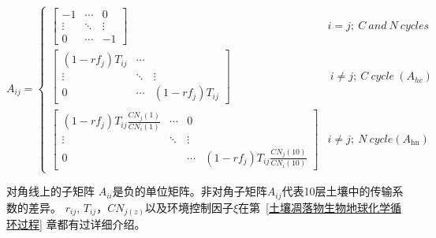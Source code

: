 \begin{equation}
  A_{i j}=\left\{\begin{array}{ccc}{\left[\begin{array}{ccc}-1 & \cdots & 0 \\ \vdots & \ddots & \vdots \\ 0 & \cdots & -1\end{array}\right]}   &i=j;\ C\ and\ N\ cycles \\
      {\left[\begin{array}{ccc}\left(1-r f_{j}\right) T_{i j} & \cdots & \\ \vdots & \ddots & \vdots \\ 0 & \cdots & \left(1-r f_{j}\right) T_{i j}\end{array}\right]}   &\ i\neq j;\ C\ cycle\ \left(A_{hc}\right)\  \\
  {\left[\begin{array}{cccc}\left(1-r f_{j}\right) T_{i j} \frac{C N_{j}(1)}{C N_{i}(1)} & \cdots & 0 \\ \vdots & \ddots & \vdots \\ 0 & & \cdots & \left(1-r f_{j}\right) T_{i j} \frac{C N_{j}(10)}{C N_{i}(10)}\end{array}\right]}& i\neq j;\ N\ cycle\left(A_{\mathrm{hn}}\right) \end{array}\right.
\end{equation}


对角线上的子矩阵 $A_{ii}$是负的单位矩阵。非对角子矩阵$A_{ij}$代表10层土壤中的传输系数的差异。
$r_{ij}$, $T_{ij}$，$CN_{j(z)}$以及环境控制因子$\xi$在第~\ref{土壤凋落物生物地球化学循环过程} 章都有过详细介绍。

